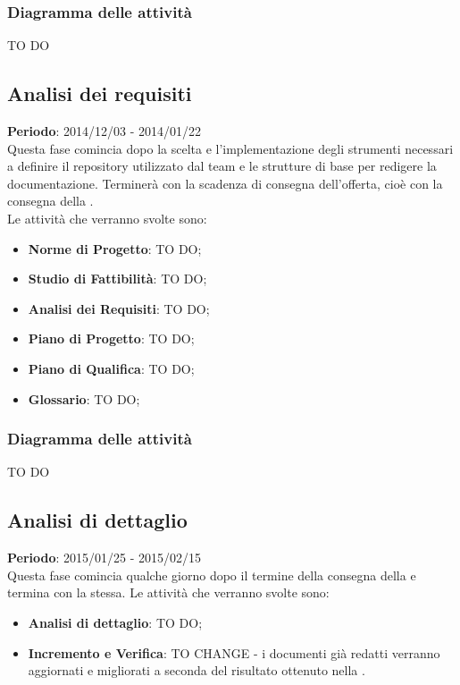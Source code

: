 		\subsubsection{Diagramma delle attività} %
		\label{ssub:diagramma_delle_attivita}
		TO DO
	
	\subsection{Analisi dei requisiti} %
	\label{sub:analisi_dei_requisiti}
	\textbf{Periodo}: 2014/12/03 - 2014/01/22 \\
	Questa fase comincia dopo la scelta e l'implementazione degli strumenti necessari a definire il repository utilizzato dal team e le strutture di base per redigere la documentazione. Terminerà con la scadenza di consegna dell'offerta, cioè con la consegna della \RR. \\
	Le attività che verranno svolte sono:
		\begin{itemize}
			\item \textbf{Norme di Progetto}: TO DO;
			\item \textbf{Studio di Fattibilità}: TO DO;
			\item \textbf{Analisi dei Requisiti}: TO DO;
			\item \textbf{Piano di Progetto}: TO DO;
			\item \textbf{Piano di Qualifica}: TO DO;
			\item \textbf{Glossario}: TO DO;
		\end{itemize}
	
		\subsubsection{Diagramma delle attività} %
		\label{ssub:diagramma_delle_attivita}
		TO DO
	
	
	\subsection{Analisi di dettaglio} %
	\label{sub:analisi_di_dettaglio}
	\textbf{Periodo}: 2015/01/25 - 2015/02/15 \\
	Questa fase comincia qualche giorno dopo il termine della consegna della \RR{} e termina con la \RR{} stessa.
	Le attività che verranno svolte sono:
		\begin{itemize}
			\item \textbf{Analisi di dettaglio}: TO DO;
			\item \textbf{Incremento e Verifica}: TO CHANGE - i documenti già redatti verranno aggiornati e migliorati a seconda del risultato ottenuto nella \RR.
		\end{itemize}
	
